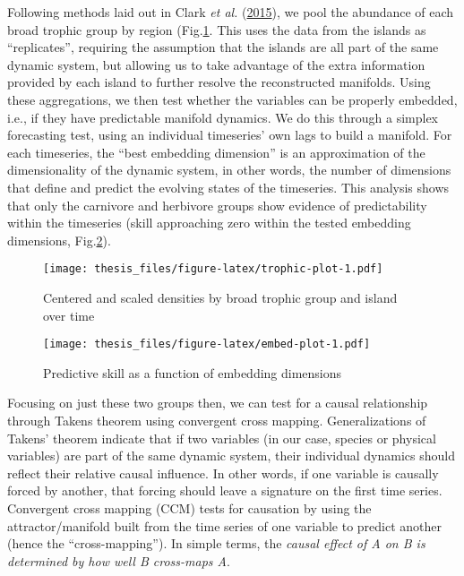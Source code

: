 \documentclass[twoside,12pt,final]{ucthesis-CA2012}
\begin{document}
\begin{ucmainmatter}
Following methods laid out in Clark \emph{et al.}
(\protect\hyperlink{ref-Clark2015}{2015}), we pool the abundance of each
broad trophic group by region (Fig.\ref{fig:trophic-plot}. This uses the
data from the islands as ``replicates'', requiring the assumption that
the islands are all part of the same dynamic system, but allowing us to
take advantage of the extra information provided by each island to
further resolve the reconstructed manifolds. Using these aggregations,
we then test whether the variables can be properly embedded, i.e., if
they have predictable manifold dynamics. We do this through a simplex
forecasting test, using an individual timeseries' own lags to build a
manifold. For each timeseries, the ``best embedding dimension'' is an
approximation of the dimensionality of the dynamic system, in other
words, the number of dimensions that define and predict the evolving
states of the timeseries. This analysis shows that only the carnivore
and herbivore groups show evidence of predictability within the
timeseries (skill approaching zero within the tested embedding
dimensions, Fig.\ref{fig:embed-plot}).
\begin{figure}
\centering
\texttt{[image: thesis\_files/figure-latex/trophic-plot-1.pdf]}
\caption{\label{fig:trophic-plot}Centered and scaled densities by broad
trophic group and island over time}
\end{figure}
\begin{figure}
\centering
\texttt{[image: thesis\_files/figure-latex/embed-plot-1.pdf]}
\caption{\label{fig:embed-plot}Predictive skill as a function of embedding
dimensions}
\end{figure}
Focusing on just these two groups then, we can test for a causal
relationship through Takens theorem using convergent cross mapping.
Generalizations of Takens' theorem indicate that if two variables (in
our case, species or physical variables) are part of the same dynamic
system, their individual dynamics should reflect their relative causal
influence. In other words, if one variable is causally forced by
another, that forcing should leave a signature on the first time series.
Convergent cross mapping (CCM) tests for causation by using the
attractor/manifold built from the time series of one variable to predict
another (hence the ``cross-mapping''). In simple terms, the \emph{causal
effect of A on B is determined by how well B cross-maps A}.


\end{ucmainmatter}
\end{document}
